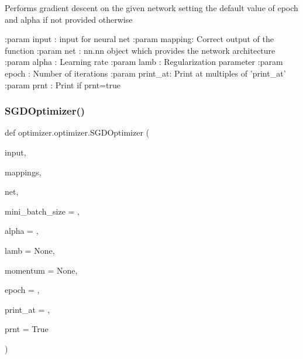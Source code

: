 \begin{DoxyVerb}Performs gradient descent on the given network setting the default value of epoch and alpha if not provided otherwise

:param input  : input for neural net
:param mapping: Correct output of the function
:param net    : nn.nn object which provides the network architecture
:param alpha  : Learning rate
:param lamb   : Regularization parameter
:param epoch  : Number of iterations
:param print_at: Print at multiples of 'print_at'
:param prnt   : Print if prnt=true
\end{DoxyVerb}
 \mbox{\label{classoptimizer_1_1optimizer_a9248b4bea24619717271e053d49abc9c}} 
\subsubsection{\texorpdfstring{S\+G\+D\+Optimizer()}{SGDOptimizer()}}
{\footnotesize\ttfamily def optimizer.\+optimizer.\+S\+G\+D\+Optimizer (\begin{DoxyParamCaption}\item[{}]{input,  }\item[{}]{mappings,  }\item[{}]{net,  }\item[{}]{mini\+\_\+batch\+\_\+size = {},  }\item[{}]{alpha = {},  }\item[{}]{lamb = {\ttfamily None},  }\item[{}]{momentum = {\ttfamily None},  }\item[{}]{epoch = {},  }\item[{}]{print\+\_\+at = {},  }\item[{}]{prnt = {\ttfamily True} }\end{DoxyParamCaption})\hspace{0.3cm}{\ttfamily [static]}}

